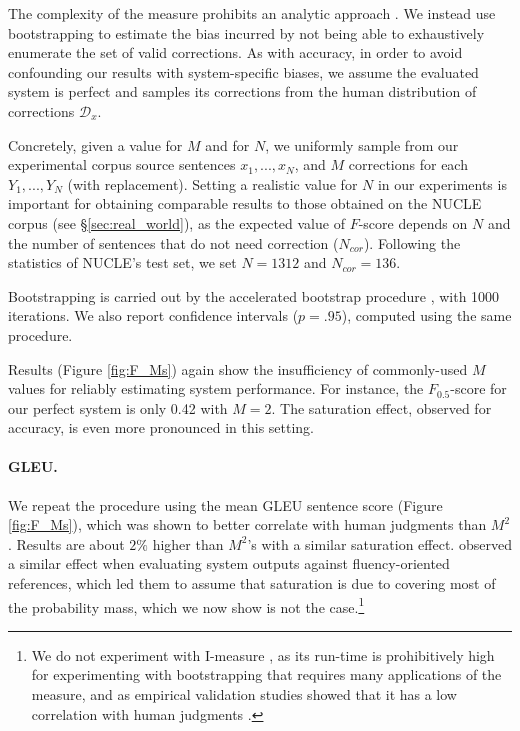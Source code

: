 \documentclass[a4paper]{article}
\begin{document}
The complexity of the measure prohibits an analytic approach \cite{yeh2000more}.
We instead use bootstrapping to estimate the bias incurred by not being able to exhaustively enumerate the set of valid corrections.
As with accuracy, in order to avoid confounding our results with system-specific biases,
we assume the evaluated system is perfect and samples its corrections from the human distribution of corrections $\mathcal{D}_x$.

Concretely, given a value for $M$ and for $N$, we uniformly sample from our experimental corpus source sentences $x_1,...,x_N$, and $M$ corrections for each $Y_1,...,Y_N$ (with replacement).
Setting a realistic value for $N$ in our experiments is important for obtaining comparable results to those obtained on the NUCLE corpus (see \S\ref{sec:real_world}),
as the expected value of $F$-score depends on $N$ and the number of sentences that do not need correction ($N_{cor}$).
Following the statistics of NUCLE's test set, we set $N=1312$ and $N_{cor}=136$.

Bootstrapping is carried out by the accelerated bootstrap procedure \cite{efron1987better}, with 1000 iterations.
We also report confidence intervals ($p=.95$), computed using the same procedure.%
%

Results (Figure \ref{fig:F_Ms}) again show the insufficiency of commonly-used
$M$ values for reliably estimating system performance.
For instance, the $F_{0.5}$-score for our perfect system is only 0.42 with $M=2$.
The saturation effect, observed for accuracy, is even more pronounced in this setting.

\paragraph{GLEU.} We repeat the procedure using the mean GLEU sentence score (Figure \ref{fig:F_Ms}), 
which was shown to better correlate with human judgments than $M^2$ \cite{napoles-sakaguchi-tetreault:2016:EMNLP2016}.
Results are about $2\%$ higher than $M^2$'s with a similar saturation effect.
\citet{sakaguchi2016reassessing} observed a similar effect when evaluating system outputs against fluency-oriented references,
which led them to assume that saturation is due to covering most of the probability mass,
which we now show is not the case.\footnote{
We do not experiment with I-measure \cite{felice2015towards}, 
as its run-time is prohibitively high for experimenting with bootstrapping
that requires many applications of the measure, and as empirical validation 
studies showed that it has a low correlation with human judgments \cite{sakaguchi2016reassessing}.}
\end{document}
